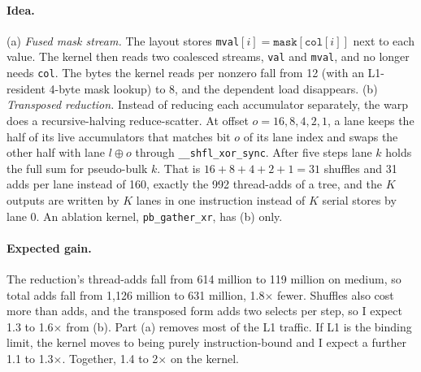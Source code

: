 \documentclass[sigconf,nonacm]{acmart}
\newcommand{\code}[1]{\texttt{#1}}
\begin{document}
\paragraph{Idea.} (a) \emph{Fused mask stream.} The layout stores \code{mval}$[i] = \code{mask}[\code{col}[i]]$
next to each value. The kernel then reads two coalesced streams, \code{val} and \code{mval}, and no
longer needs \code{col}. The bytes the kernel reads per nonzero fall from 12 (with an L1-resident
4-byte mask lookup) to 8, and the dependent load disappears. (b) \emph{Transposed reduction.} Instead
of reducing each accumulator separately, the warp does a recursive-halving reduce-scatter. At offset
$o = 16, 8, 4, 2, 1$, a lane keeps the half of its live accumulators that matches bit $o$ of its lane
index and swaps the other half with lane $l \oplus o$ through \code{\_\_shfl\_xor\_sync}. After five
steps lane $k$ holds the full sum for pseudo-bulk $k$. That is $16+8+4+2+1 = 31$ shuffles and 31 adds
per lane instead of 160, exactly the 992 thread-adds of a tree, and the $K$ outputs are written by $K$
lanes in one instruction instead of $K$ serial stores by lane 0. An ablation kernel,
\code{pb\_gather\_xr}, has (b) only.

\paragraph{Expected gain.} The reduction's thread-adds fall from 614 million to 119 million on medium,
so total adds fall from 1,126 million to 631 million, 1.8$\times$ fewer. Shuffles also cost more than
adds, and the transposed form adds two selects per step, so I expect 1.3 to 1.6$\times$ from (b). Part
(a) removes most of the L1 traffic. If L1 is the binding limit, the kernel moves to being purely
instruction-bound and I expect a further 1.1 to 1.3$\times$. Together, 1.4 to 2$\times$ on the kernel.
\end{document}
